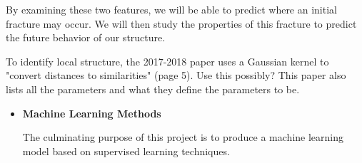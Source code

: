 \begin{itemize}
By examining these two features, we will be able to predict where an initial fracture may occur. We will then study the properties of this fracture to predict the future behavior of our structure.

To identify local structure, the 2017-2018 paper uses a Gaussian kernel to "convert distances to similarities" (page 5). Use this possibly? This paper also lists all the parameters and what they define the parameters to be.
\end{itemize}

\begin{itemize}
\item \textbf{Machine Learning Methods} 

The culminating purpose of this project is to produce a machine learning model based on supervised learning techniques. 


\end{itemize}

